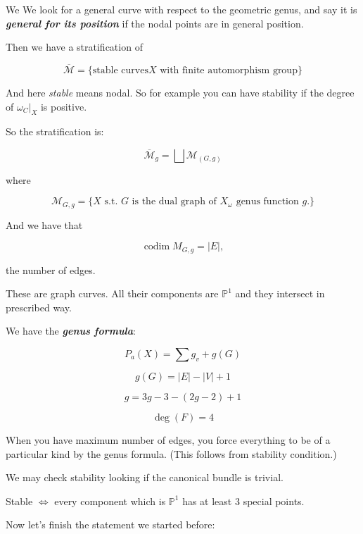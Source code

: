 We
We look for a general curve with respect to
the geometric genus, and say it is
\textit{\textbf{general for its position}} if
the nodal points are in general position.

Then we have a stratification of

$$
\overline{\mathcal{M}}=\{\text{stable curves
} X \text{ with finite automorphism group}
\}
$$

And here \textit{stable} means nodal. So for
example you can have stability if the degree
of $\omega_C|_{X}$ is positive.

So the stratification is:

$$
\overline{\mathcal{M}}_{g}=\bigsqcup
\mathcal{M}_{(G,g)}
$$

where

$$
\mathcal{M}_{G,g}=\{X\text{ s.t. $G$ is the
dual graph of $X_\omega$ genus function $g$.}
\}
$$

And we have that

$$
\operatorname{codim}M_{G,g}=|E|,
$$

the number of edges.

\begin{remark}
\label{remark-esteves1-1}
These are graph curves. All their components
are $\mathbb{P}^1$ and they intersect in
prescribed way.
\end{remark}

\medskip{}

We have the \textit{\textbf{genus formula}}:

$$
P_a(X)=\sum g_v+g(G)
$$

$$
g(G)=|E|-|V| +1
$$

$$
g=3g-3-(2g-2)+1
$$

$$
\operatorname{deg}(F)=4
$$

\medskip{}
When you have maximum number of edges, you
force everything to be of a particular kind
by the genus formula. (This follows from
stability condition.)

\begin{remark}
\label{remark-esteves1-2}
We may check stability looking if the
canonical bundle is trivial.
\end{remark}

\medskip{}
Stable $\iff$ every component which is
$\mathbb{P}^1$ has at least 3 special points.

\medskip{}

Now let's finish the statement we started
before:


